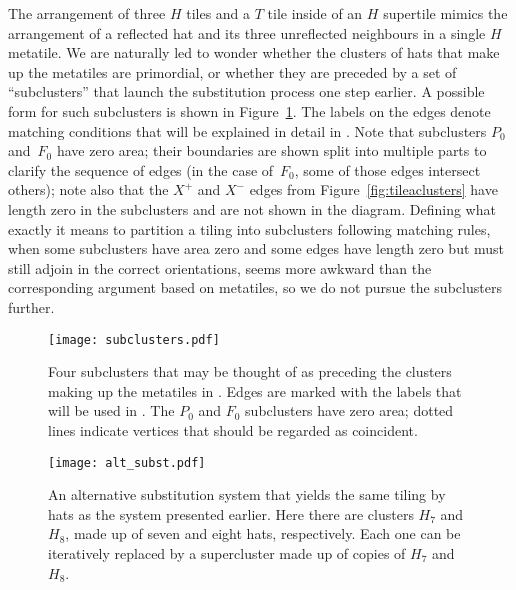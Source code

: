The arrangement of three $H$ tiles and a $T$ tile inside of an $H$ 
supertile mimics the arrangement of a reflected hat and its three
unreflected neighbours in a single $H$ metatile.  We are naturally
led to wonder whether the clusters of hats that make up the metatiles
are primordial, or whether they are preceded by a set of ``subclusters''
that launch the substitution process one step earlier.
A possible form for such subclusters is shown in Figure~\ref{fig:subclusters}.
The labels on the edges denote matching conditions that will be explained
in detail in .
Note that subclusters $P_0$ and~$F_0$
have zero area; their boundaries are shown split into multiple
parts to clarify the sequence of edges (in the case of~$F_0$, some of
those edges intersect others); note also that the $X^+$ and $X^-$
edges from Figure~\ref{fig:tileaclusters} have length zero in the
subclusters and are not shown in the diagram.  Defining what exactly
it means to partition a tiling into subclusters following matching
rules, when some subclusters have area zero and some edges have length
zero but must still adjoin in the correct orientations, seems 
more awkward than the corresponding argument
based on metatiles, so we do not pursue the subclusters further.

\begin{figure}[htp!]
\begin{center}
\texttt{[image: subclusters.pdf]}
\end{center}
\caption{\label{fig:subclusters}
	Four subclusters that may be thought of as preceding the clusters making
	up the metatiles in .  Edges are marked with
	the labels that will be used in .  The
	$P_0$ and $F_0$ subclusters have zero area; dotted lines indicate 
	vertices that should be regarded as coincident.}
\end{figure}


\begin{figure}[htp!]
\begin{center}
\texttt{[image: alt\_subst.pdf]}
\end{center}
\caption{\label{fig:alt_subst}An alternative substitution system that
	yields the same tiling by hats as the system presented earlier.
	Here there are clusters $H_7$ and $H_8$, made up of seven and eight
	hats, respectively.  Each one can be iteratively replaced by a 
	supercluster made up of copies of $H_7$ and $H_8$.}
\end{figure}

